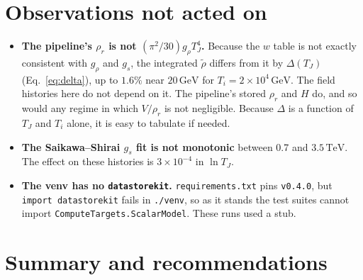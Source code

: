 \documentclass[11pt,a4paper]{article}
\newcommand{\TJ}{T_{J}}
\newcommand{\GeV}{\,\mathrm{GeV}}
\newcommand{\code}[1]{\texttt{#1}}
\begin{document}
\section{Observations not acted on}

\begin{itemize}
\item \textbf{The pipeline's $\rho_r$ is not $(\pi^2/30)g_\rho\TJ^4$.} Because the $w$ table is
  not exactly consistent with $g_\rho$ and $g_s$, the integrated $\tilde\rho$ differs from it by
  $\Delta(\TJ)$ (Eq.~\ref{eq:delta}), up to $1.6\%$ near $20\GeV$ for $T_i = 2\times10^4\GeV$.
  The field histories here do not depend on it. The pipeline's stored $\rho_r$ and $H$ do, and
  so would any regime in which $V/\rho_r$ is not negligible. Because $\Delta$ is a function of
  $\TJ$ and $T_i$ alone, it is easy to tabulate if needed.
\item \textbf{The Saikawa--Shirai $g_s$ fit is not monotonic} between 0.7 and $3.5\,\mathrm{TeV}$.
  The effect on these histories is $3\times10^{-4}$ in $\ln\TJ$.
\item \textbf{The venv has no \code{datastorekit}.} \code{requirements.txt} pins \code{v0.4.0},
  but \code{import datastorekit} fails in \code{./venv}, so as it stands the test suites cannot
  import \code{ComputeTargets.ScalarModel}. These runs used a stub.
\end{itemize}

\section{Summary and recommendations}
\end{document}
